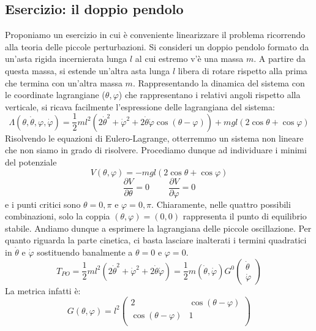 \documentclass[a4paper,openany]{article}
\begin{document}
	\subsection{Esercizio: il doppio pendolo}
	Proponiamo un esercizio in cui è conveniente linearizzare il problema ricorrendo alla teoria delle piccole perturbazioni. Si consideri un doppio pendolo formato da un'asta rigida incernierata lunga $l$ al cui estremo v'è una massa $m$. A partire da questa massa, si estende un'altra asta lunga $l$ libera di rotare rispetto alla prima che termina con un'altra massa $m$. Rappresentando la dinamica del sistema con le coordinate lagrangiane ($\theta,\varphi$) che rappresentano i relativi angoli rispetto alla verticale, si ricava facilmente l'espressione delle lagrangiana del sistema:
	\begin{equation}\label{key}
		\Lambda(\theta,\dot{\theta},\varphi,\dot{\varphi}) = \dfrac{1}{2}ml^2 (2\dot{\theta}^2+ \dot{\varphi}^2 + 2\dot{\theta}\dot{\varphi}\cos(\theta-\varphi)) + mgl(2\cos\theta + \cos\varphi)
	\end{equation}
	Risolvendo le equazioni di Eulero-Lagrange, otterremmo un sistema non lineare che non siamo in grado di risolvere. Procediamo dunque ad individuare i minimi del potenziale 
	$$
	V(\theta,\varphi) = -mgl(2\cos\theta + \cos\varphi)
	$$
	$$
	\dfrac{\partial V}{\partial \theta} = 0 \>\> \>\> \>\> \>\> \>\> \dfrac{\partial V}{\partial \varphi} = 0
	$$
	e i punti critici sono $\theta =0,\pi$ e $\varphi = 0,\pi$. Chiaramente, nelle quattro possibili combinazioni, solo la coppia $(\theta,\varphi)=(0,0)$ rappresenta il punto di equilibrio stabile. Andiamo dunque a esprimere la lagrangiana delle piccole oscillazione. Per quanto riguarda la parte cinetica, ci basta lasciare inalterati i termini quadratici in $\dot{\theta} \mbox{ e }\dot{\varphi}$ sostituendo banalmente a $\theta = 0 \mbox{ e } \varphi = 0$.
	\begin{equation}
		T_{PO} = \dfrac{1}{2}ml^2 (2\dot{\theta}^2+ \dot{\varphi}^2 + 2\dot{\theta}\dot{\varphi}) =  \dfrac{1}{2}m(\dot{\theta},\dot{\varphi})G^{0}
		\begin{pmatrix}
			\dot{\theta} \\
			\dot{\varphi}
		\end{pmatrix}
	\end{equation}
	La metrica infatti è:
	\begin{equation}
		G(\theta,\varphi) = l^2
		\begin{pmatrix}
			2 & \cos(\theta-\varphi) \\
			\cos(\theta-\varphi) & 1 \\
		\end{pmatrix}
	\end{equation}
\end{document}
